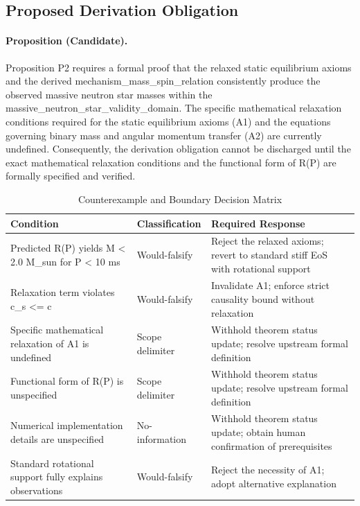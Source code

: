 \documentclass[conference]{IEEEtran}
\begin{document}
\subsection{Proposed Derivation Obligation}
\paragraph{Proposition (Candidate).} Proposition P2 requires a formal proof that the relaxed static equilibrium axioms and the derived mechanism\_mass\_spin\_relation consistently produce the observed massive neutron star masses within the massive\_neutron\_star\_validity\_domain. The specific mathematical relaxation conditions required for the static equilibrium axioms (A1) and the equations governing binary mass and angular momentum transfer (A2) are currently undefined. Consequently, the derivation obligation cannot be discharged until the exact mathematical relaxation conditions and the functional form of R(P) are formally specified and verified.

\begin{table}[htbp]
\centering
\footnotesize
\setlength{\tabcolsep}{3pt}
\renewcommand{\arraystretch}{1.12}
\caption{Counterexample and Boundary Decision Matrix}
\label{tab:forward-derivation-and-counterexamples-b6}
\begin{tabular}{|p{}|p{}|p{}|}
\hline
Condition & Classification & Required Response \\\hline
Predicted R(P) yields M < 2.0 M\_sun for P < 10 ms & Would-falsify & Reject the relaxed axioms; revert to standard stiff EoS with rotational support \\\hline
Relaxation term violates c\_s <= c & Would-falsify & Invalidate A1; enforce strict causality bound without relaxation \\\hline
Specific mathematical relaxation of A1 is undefined & Scope delimiter & Withhold theorem status update; resolve upstream formal definition \\\hline
Functional form of R(P) is unspecified & Scope delimiter & Withhold theorem status update; resolve upstream formal definition \\\hline
Numerical implementation details are unspecified & No-information & Withhold theorem status update; obtain human confirmation of prerequisites \\\hline
Standard rotational support fully explains observations & Would-falsify & Reject the necessity of A1; adopt alternative explanation \\\hline
\end{tabular}
\end{table}
\end{document}
